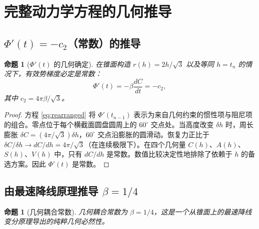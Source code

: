 \documentclass[12pt,a4paper]{article}
\newtheorem{proposition}[theorem]{命题}
\begin{document}
\section{完整动力学方程的几何推导}
\label{sec:geometric}

\subsection{$\Phi'(t) = -c_2$（常数）的推导}

\begin{proposition}[$\Phi'(t)$ 的几何确定]
\label{prop:constant}
在锥面构造 $r(h)=2h/\sqrt{3}$ 以及等同 $h=t_n$ 的情况下，有效势梯度必定是常数：
\begin{equation}
\Phi'(t) = -\beta\frac{dC}{dt} = -c_2,
\end{equation}
其中 $c_2 = 4\pi\beta/\sqrt{3}$。
\end{proposition}

\begin{proof}
方程 \eqref{eq:rearranged} 将 $\Phi'(t_{n-1})$ 表示为来自几何约束的惯性项与阻尼项的组合。零点位于每个横截面圆盘圆周上的 $60^\circ$ 交点处。当高度改变 $\delta h$ 时，周长膨胀 $\delta C = (4\pi/\sqrt{3})\delta h$，$60^\circ$ 交点沿膨胀的圆滑动。恢复力正比于 $\delta C/\delta h \to dC/dh = 4\pi/\sqrt{3}$（在连续极限下）。在四个几何量 $C(h)$、$A(h)$、$S(h)$、$V(h)$ 中，只有 $dC/dh$ 是常数。数值比较决定性地排除了依赖于 $h$ 的备选方案。因此 $\Phi'(t)$ 是常数。
\end{proof}

\subsection{由最速降线原理推导 $\beta = 1/4$}

\begin{proposition}[几何耦合常数]
\label{prop:beta}
几何耦合常数为 $\beta = 1/4$，这是一个从锥面上的最速降线变分原理导出的纯粹几何必然性。
\end{proposition}
\end{document}

